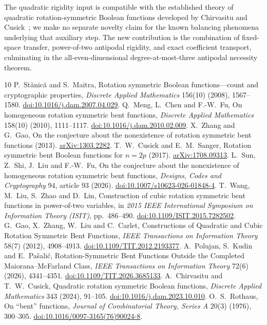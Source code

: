 \documentclass[11pt,a4paper]{article}
\begin{document}
The quadratic rigidity input is compatible with the established theory of quadratic rotation-symmetric Boolean functions developed by Chirvasitu and Cusick~\cite{chircusick}; we make no separate novelty claim for the known balancing phenomena underlying that auxiliary step. The new contribution is the combination of fixed-space transfer, power-of-two antipodal rigidity, and exact coefficient transport, culminating in the all-even-dimensional degree-at-most-three antipodal necessity theorem.

\begin{thebibliography}{10}
 P.~St\u{a}nic\u{a} and S.~Maitra, Rotation symmetric Boolean functions---count and cryptographic properties, \emph{Discrete Applied Mathematics} 156(10) (2008), 1567--1580. \href{https://doi.org/10.1016/j.dam.2007.04.029}{doi:10.1016/j.dam.2007.04.029}.
 Q.~Meng, L.~Chen and F.-W.~Fu, On homogeneous rotation symmetric bent functions, \emph{Discrete Applied Mathematics} 158(10) (2010), 1111--1117. \href{https://doi.org/10.1016/j.dam.2010.02.009}{doi:10.1016/j.dam.2010.02.009}.
 X.~Zhang and G.~Gao, On the conjecture about the nonexistence of rotation symmetric bent functions (2013). \href{https://arxiv.org/abs/1303.2282}{arXiv:1303.2282}.
 T.~W.~Cusick and E.~M.~Sanger, Rotation symmetric bent Boolean functions for $n=2p$ (2017). \href{https://arxiv.org/abs/1708.09313}{arXiv:1708.09313}.
 L.~Sun, Z.~Shi, J.~Liu and F.-W.~Fu, On the conjecture about the nonexistence of homogeneous rotation symmetric bent functions, \emph{Designs, Codes and Cryptography} 94, article 93 (2026). \href{https://doi.org/10.1007/s10623-026-01848-4}{doi:10.1007/s10623-026-01848-4}.
 T.~Wang, M.~Liu, S.~Zhao and D.~Lin, Construction of cubic rotation symmetric bent functions in power-of-two variables, in \emph{2015 IEEE International Symposium on Information Theory (ISIT)}, pp.~486--490. \href{https://doi.org/10.1109/ISIT.2015.7282502}{doi:10.1109/ISIT.2015.7282502}.
 G.~Gao, X.~Zhang, W.~Liu and C.~Carlet, Constructions of Quadratic and Cubic Rotation Symmetric Bent Functions, \emph{IEEE Transactions on Information Theory} 58(7) (2012), 4908--4913. \href{https://doi.org/10.1109/TIT.2012.2193377}{doi:10.1109/TIT.2012.2193377}.
 A.~Polujan, S.~Kudin and E.~Pa\v{s}ali\'c, Rotation-Symmetric Bent Functions Outside the Completed Maiorana--McFarland Class, \emph{IEEE Transactions on Information Theory} 72(6) (2026), 4341--4351. \href{https://doi.org/10.1109/TIT.2026.3685133}{doi:10.1109/TIT.2026.3685133}.
 A.~Chirvasitu and T.~W.~Cusick, Quadratic rotation symmetric Boolean functions, \emph{Discrete Applied Mathematics} 343 (2024), 91--105. \href{https://doi.org/10.1016/j.dam.2023.10.010}{doi:10.1016/j.dam.2023.10.010}.
 O.~S.~Rothaus, On ``bent'' functions, \emph{Journal of Combinatorial Theory, Series A} 20(3) (1976), 300--305. \href{https://doi.org/10.1016/0097-3165(76)90024-8}{doi:10.1016/0097-3165(76)90024-8}.
\end{thebibliography}
\end{document}
